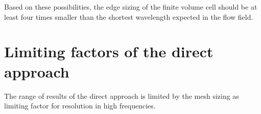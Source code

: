 Based on these possibilities, the edge sizing of the finite volume cell should be at least four times smaller than the shortest wavelength expected in the flow field.

\section{Limiting factors of the direct approach} \label{limits}

The range of results of the direct approach is limited by the mesh sizing as limiting factor for resolution in high frequencies. 






